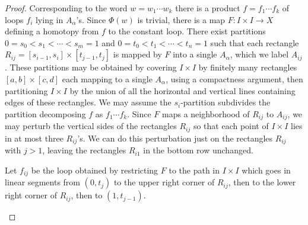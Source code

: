 \begin{proof}
Corresponding to the word $w = w_1 \cdots w_k$ there is a product $f = f_1 \cdots f_k$ of loops $f_i$ lying in $A_\alpha$'s. Since $\Phi(w)$ is trivial, there is a map $F: I \times I \to X$ defining a homotopy from $f$ to the constant loop. There exist partitions $0 = s_0 < s_1 < \cdots < s_m = 1$ and $0 = t_0 < t_1 < \cdots < t_n = 1$ such that each rectangle $R_{ij} = [s_{i-1}, s_i] \times [t_{j-1}, t_j]$ is mapped by $F$ into a single $A_\alpha$, which we label $A_{ij}$. These partitions may be obtained by covering $I \times I$ by finitely many rectangles $[a,b] \times [c,d]$ each mapping to a single $A_\alpha$, using a compactness argument, then partitioning $I \times I$ by the union of all the horizontal and vertical lines containing edges of these rectangles. We may assume the $s_i$-partition subdivides the partition decomposing $f$ as $f_1 \cdots f_k$. Since $F$ maps a neighborhood of $R_{ij}$ to $A_{ij}$, we may perturb the vertical sides of the rectangles $R_{ij}$ so that each point of $I \times I$ lies in at most three $R_{ij}$'s. We can do this perturbation just on the rectangles $R_{ij}$ with $j > 1$, leaving the rectangles $R_{i1}$ in the bottom row unchanged.

Let $f_{ij}$ be the loop obtained by restricting $F$ to the path in $I \times I$ which goes in linear segments from $(0, t_j)$ to the upper right corner of $R_{ij}$, then to the lower right corner of $R_{ij}$, then to $(1, t_{j-1})$.

\begin{center}
\end{center}


\end{proof}
